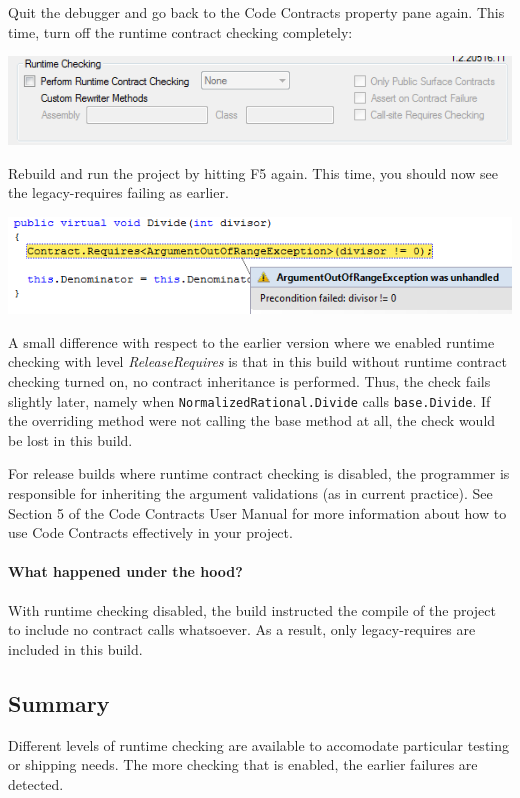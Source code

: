 \documentclass{article}
\newcommand{\code}[1]{\lstinline{#1}}
\begin{document}
Quit the debugger and go back to the \textsf{Code Contracts} property
pane again. This time, turn off the runtime contract checking completely:
\begin{center}
  \includegraphics[width=.8\columnwidth]{ex10.png}
\end{center}
Rebuild and run the project by hitting F5 again. This time, you should
now see the legacy-requires failing as earlier.
\begin{center}
  \includegraphics[width=.8\columnwidth]{ex7.png}
\end{center}
A small difference  with respect to the earlier version where we
enabled runtime checking with level \emph{ReleaseRequires} is that in
this build without runtime contract checking turned on, no contract
inheritance is performed. Thus, the check fails slightly later, namely
when \code{NormalizedRational.Divide} calls \code{base.Divide}. If the
overriding method were not calling the base method at all, the check
would be lost in this build.

For release builds where runtime contract checking is disabled, the
programmer is responsible for inheriting the argument validations (as
in current practice). See Section 5 of the Code Contracts User Manual
for more information about how to use Code Contracts effectively in
your project.

\paragraph{What happened under the hood?} With runtime checking
disabled, the build instructed the compile 
of the project to include no contract calls whatsoever. As a result,
only legacy-requires are included in this build.

\subsection{Summary}
Different levels of runtime checking are available to accomodate
particular testing or shipping needs. The more checking that is
enabled, the earlier failures are detected.
\end{document}
